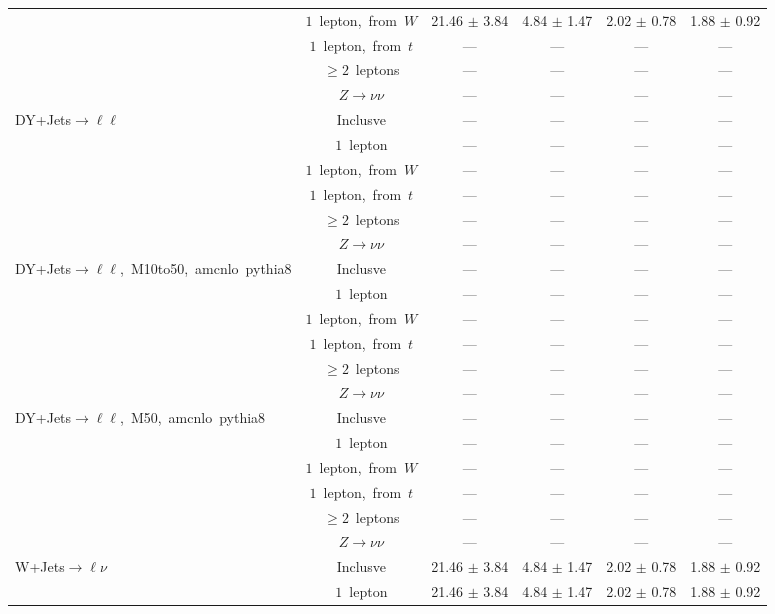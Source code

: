 \documentclass{article}
\begin{document}
\begin{longtable}{|l|c|c|c|c|c|}
 & $1$~lepton,~from~$W$  & 21.46 $\pm$ 3.84  & 4.84 $\pm$ 1.47  & 2.02 $\pm$ 0.78  & 1.88 $\pm$ 0.92 \\* 
 & $1$~lepton,~from~$t$  & ---  & ---  & ---  & --- \\* 
 & $\ge2$~leptons  & ---  & ---  & ---  & --- \\* 
 & $Z\rightarrow\nu\nu$  & ---  & ---  & ---  & --- \\* 
\hline 
\multirow{6}{*}{DY+Jets$\rightarrow\ell\ell$} & Inclusve  & ---  & ---  & ---  & --- \\* 
 & $1$~lepton  & ---  & ---  & ---  & --- \\* 
 & $1$~lepton,~from~$W$  & ---  & ---  & ---  & --- \\* 
 & $1$~lepton,~from~$t$  & ---  & ---  & ---  & --- \\* 
 & $\ge2$~leptons  & ---  & ---  & ---  & --- \\* 
 & $Z\rightarrow\nu\nu$  & ---  & ---  & ---  & --- \\* 
\hline 
\multirow{6}{*}{DY+Jets$\rightarrow\ell\ell$,~M10to50,~amcnlo~pythia8} & Inclusve  & ---  & ---  & ---  & --- \\* 
 & $1$~lepton  & ---  & ---  & ---  & --- \\* 
 & $1$~lepton,~from~$W$  & ---  & ---  & ---  & --- \\* 
 & $1$~lepton,~from~$t$  & ---  & ---  & ---  & --- \\* 
 & $\ge2$~leptons  & ---  & ---  & ---  & --- \\* 
 & $Z\rightarrow\nu\nu$  & ---  & ---  & ---  & --- \\* 
\hline 
\multirow{6}{*}{DY+Jets$\rightarrow\ell\ell$,~M50,~amcnlo~pythia8} & Inclusve  & ---  & ---  & ---  & --- \\* 
 & $1$~lepton  & ---  & ---  & ---  & --- \\* 
 & $1$~lepton,~from~$W$  & ---  & ---  & ---  & --- \\* 
 & $1$~lepton,~from~$t$  & ---  & ---  & ---  & --- \\* 
 & $\ge2$~leptons  & ---  & ---  & ---  & --- \\* 
 & $Z\rightarrow\nu\nu$  & ---  & ---  & ---  & --- \\* 
\hline 
\multirow{6}{*}{W+Jets$\rightarrow\ell\nu$} & Inclusve  & 21.46 $\pm$ 3.84  & 4.84 $\pm$ 1.47  & 2.02 $\pm$ 0.78  & 1.88 $\pm$ 0.92 \\* 
 & $1$~lepton  & 21.46 $\pm$ 3.84  & 4.84 $\pm$ 1.47  & 2.02 $\pm$ 0.78  & 1.88 $\pm$ 0.92 \\* 

\end{longtable}
\end{document}
